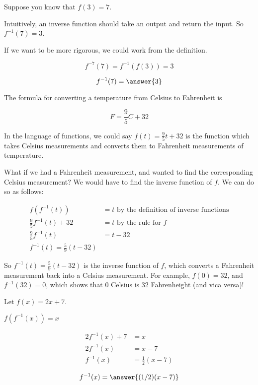\documentclass{ximera}
\begin{document}
\begin{question}
	Suppose you know that $f(3) = 7$.
	
	\begin{hint}
		Intuitively, an inverse function should take an output and return the input.  So $f^{-1}(7) = 3$.  
		
		If we want to be more rigorous, we could work from the definition.  
		
		\[f^{-7}(7) = f^{-1}(f(3)) = 3\]
	\end{hint}
	
	\[f^{-1}(7) = \answer{3}\]
	
\end{question}

\begin{example}
	The formula for converting a temperature from Celsius to Fahrenheit is 
	
	\[F = \frac{9}{5} C + 32\]
	
	In the language of functions, we could say $f(t) = \frac{9}{5} t + 32$ is the function which takes Celsius measurements and converts them to Fahrenheit measurements of temperature.
	
	What if we had a Fahrenheit measurement, and wanted to find the corresponding Celsius measurement?  We would have to find the inverse function of $f$.   We can do so as follows:
	
	\begin{align*}
		f(f^{-1}(t)) &= t \text{ by the definition of inverse functions}\\
		\frac{9}{5} f^{-1}(t)+32 &= t \text{ by the  rule for $f$}\\
		\frac{9}{5} f^{-1}(t)&= t -32\\
		f^{-1}(t) = \frac{5}{9}(t - 32)
	\end{align*}
	
	So $f^{-1}(t) = \frac{5}{9}(t - 32)$ is the inverse function of $f$, which converts a Fahrenheit measurement back into a Celsius measurement.  For example,  $f(0) = 32$, and $f^{-1}(32) = 0$, which shows that $0$ Celsius  is $32$ Fahrenheight (and vica versa)!
\end{example}

\begin{question}
	Let $f(x) = 2x+7$.
	
	\begin{hint}
		$f(f^{-1}(x))=x$
	\end{hint}
	\begin{hint}
		\begin{align*}
			2f^{-1}(x)+7 &= x\\
			2f^{-1}(x) &= x-7\\
			f^{-1}(x) &= \frac{1}{2}(x-7)
		\end{align*}
	\end{hint}
	\[
	f^{-1}(x) = \answer{(1/2)(x-7)}
	\]
\end{question}
\end{document}
